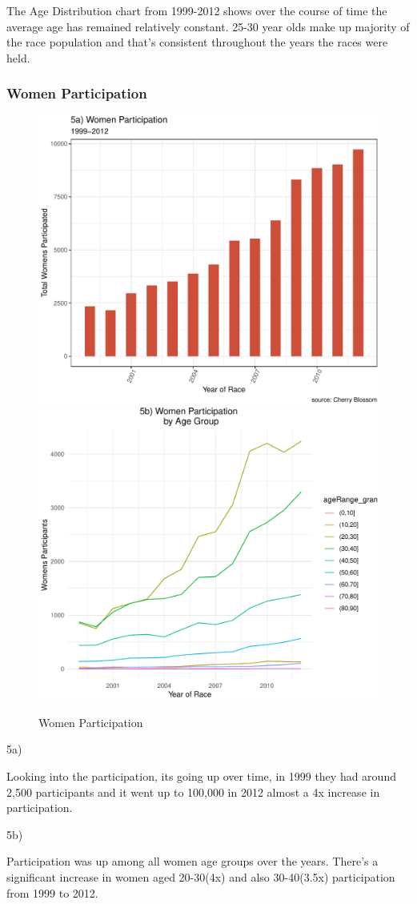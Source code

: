 \documentclass[
]{article}
\begin{document}
The Age Distribution chart from 1999-2012 shows over the course of time
the average age has remained relatively constant. 25-30 year olds make
up majority of the race population and that's consistent throughout the
years the races were held.

\hypertarget{women-participation}{%
\subsubsection{Women Participation}\label{women-participation}}

\begin{figure}[H]

\includegraphics[width=.49\linewidth,]{case_study02_files/figure-latex/unnamed-chunk-13-1} \includegraphics[width=.49\linewidth,]{case_study02_files/figure-latex/unnamed-chunk-13-2} \hfill{}

\caption{Women Participation}\label{fig:unnamed-chunk-13}
\end{figure}

5a)

Looking into the participation, its going up over time, in 1999 they had
around 2,500 participants and it went up to 100,000 in 2012 almost a 4x
increase in participation.

5b)

Participation was up among all women age groups over the years. There's
a significant increase in women aged 20-30(4x) and also 30-40(3.5x)
participation from 1999 to 2012.
\end{document}
